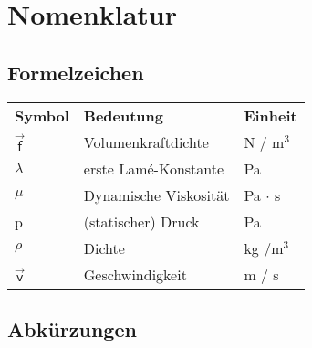 \chapter*{Nomenklatur}
\label{AKV}
\section*{Formelzeichen}

\begin{longtable}{p{1.5cm}p{11cm}l}
	\textbf{Symbol} 	& \textbf{Bedeutung} 			& \textbf{Einheit} \endhead \\ %
	$\vec{\mathsf{f}}$	& Volumenkraftdichte			& N / $\mathrm{m^3}$ \\
	$\lambda$			& erste Lamé-Konstante			& Pa \\
	$\mu$				& Dynamische Viskosität			& Pa $\cdot$ s \\
	p					& (statischer) Druck			& Pa \\
	$\rho$ 				& Dichte 						& kg /$\mathrm{m^3}$ \\
	$\vec{\mathsf{v}}$	& Geschwindigkeit				& m / s \\

	
		
\end{longtable}


\section*{Abkürzungen}

\begin{acronym}[FDS]
	
\end{acronym}
